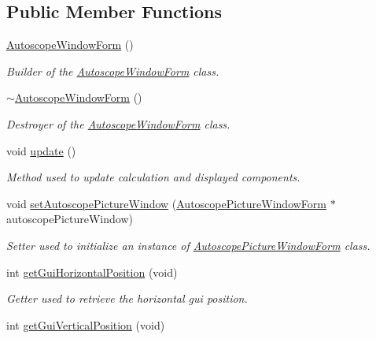 \subsection*{Public Member Functions}
\begin{DoxyCompactItemize}
\item 
\mbox{\hyperlink{class_autoscope_window_form_abff392139c212a6f9e183d3984a02a47}{Autoscope\+Window\+Form}} ()
\begin{DoxyCompactList}\small\item\em Builder of the \mbox{\hyperlink{class_autoscope_window_form}{Autoscope\+Window\+Form}} class. \end{DoxyCompactList}\item 
\mbox{\hyperlink{class_autoscope_window_form_a2a7cceef655815a6c6ee1cc65a40fa8d}{$\sim$\+Autoscope\+Window\+Form}} ()
\begin{DoxyCompactList}\small\item\em Destroyer of the \mbox{\hyperlink{class_autoscope_window_form}{Autoscope\+Window\+Form}} class. \end{DoxyCompactList}\item 
void \mbox{\hyperlink{class_autoscope_window_form_a732f751b8de766e03f5f79a7a08db136}{update}} ()
\begin{DoxyCompactList}\small\item\em Method used to update calculation and displayed components. \end{DoxyCompactList}\item 
void \mbox{\hyperlink{class_autoscope_window_form_a4308f566557feaba98e031e28e527812}{set\+Autoscope\+Picture\+Window}} (\mbox{\hyperlink{class_autoscope_picture_window_form}{Autoscope\+Picture\+Window\+Form}} $\ast$autoscope\+Picture\+Window)
\begin{DoxyCompactList}\small\item\em Setter used to initialize an instance of \mbox{\hyperlink{class_autoscope_picture_window_form}{Autoscope\+Picture\+Window\+Form}} class. \end{DoxyCompactList}\item 
int \mbox{\hyperlink{class_autoscope_window_form_ad065e4a2a518d779407238e3c258f6e6}{get\+Gui\+Horizontal\+Position}} (void)
\begin{DoxyCompactList}\small\item\em Getter used to retrieve the horizontal gui position. \end{DoxyCompactList}\item 
int \mbox{\hyperlink{class_autoscope_window_form_a0d92cd0c7342749009e12058517ba060}{get\+Gui\+Vertical\+Position}} (void)

\end{DoxyCompactItemize}
